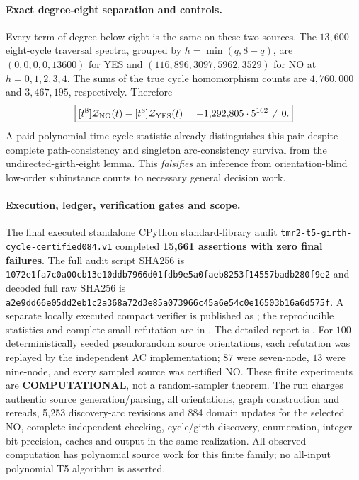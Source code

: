 \documentclass[11pt]{article}
\begin{document}
\paragraph{Exact degree-eight separation and controls.}
Every term of degree below eight is the same on these
two sources. The $13{,}600$ eight-cycle traversal spectra,
grouped by $h=\min(q,8-q)$, are
$(0,0,0,0,13600)$ for YES and
$(116,896,3097,5962,3529)$ for NO
at $h=0,1,2,3,4$. The sums of the true cycle
homomorphism counts are $4{,}760{,}000$ and
$3{,}467{,}195$, respectively. Therefore
\[
\boxed{
[t^8]\mathcal Z_{\rm NO}(t)-
[t^8]\mathcal Z_{\rm YES}(t)
=-1{,}292{,}805\cdot5^{162}\ne0.
}
\]
A paid polynomial-time cycle statistic already distinguishes
this pair despite complete path-consistency and singleton
arc-consistency survival from the undirected-girth-eight
lemma. This \emph{falsifies} an inference from orientation-blind
low-order subinstance counts to necessary general decision work.

\paragraph{Execution, ledger, verification gates and scope.}
The final executed standalone CPython standard-library
audit \texttt{tmr2-t5-girth-cycle-certified084.v1}
completed \textbf{15,661 assertions with zero final failures}.
The full audit script SHA256 is
\texttt{1072e1fa7c0a00cb13e10ddb7966d01fdb9e5a0faeb8253f14557badb280f9e2}
and decoded full raw SHA256 is
\texttt{a2e9dd66e05dd2eb1c2a368a72d3e85a073966c45a6e54c0e16503b16a6d575f}.
A separate locally executed compact verifier is published as
;
the reproducible statistics and complete small refutation are in
.
The detailed report is
.
For $100$ deterministically seeded pseudorandom source
orientations, each refutation was replayed by the independent
AC implementation; $87$ were seven-node, $13$ were nine-node,
and every sampled source was certified NO. These finite
experiments are \textbf{COMPUTATIONAL}, not a random-sampler
theorem. The run charges authentic source generation/parsing,
all orientations, graph construction and rereads, 5,253
discovery-arc revisions and 884 domain updates for the selected
NO, complete independent checking, cycle/girth discovery,
enumeration, integer bit precision, caches and output in the
same realization. All observed computation has polynomial
source work for this finite family; no all-input polynomial
T5 algorithm is asserted.
\end{document}
